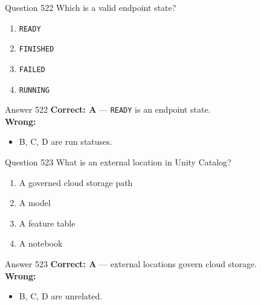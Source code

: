 \documentclass[aspectratio=169,11pt]{beamer}
\begin{document}
	\begin{frame}{Question 522}
		Which is a valid endpoint state?
		\begin{enumerate}[label=\Alph*.]
			\item \texttt{READY}
			\item \texttt{FINISHED}
			\item \texttt{FAILED}
			\item \texttt{RUNNING}
		\end{enumerate}
	\end{frame}
	\begin{frame}{Answer 522}
		\textbf{Correct: A} --- \texttt{READY} is an endpoint state.\\
		\vspace{0.5em}
		\textbf{Wrong:}
		\begin{itemize}
			\item B, C, D are run statuses.
		\end{itemize}
	\end{frame}
	
	\begin{frame}{Question 523}
		What is an external location in Unity Catalog?
		\begin{enumerate}[label=\Alph*.]
			\item A governed cloud storage path
			\item A model
			\item A feature table
			\item A notebook
		\end{enumerate}
	\end{frame}
	\begin{frame}{Answer 523}
		\textbf{Correct: A} --- external locations govern cloud storage.\\
		\vspace{0.5em}
		\textbf{Wrong:}
		\begin{itemize}
			\item B, C, D are unrelated.
		\end{itemize}
	\end{frame}
	
\end{document}
